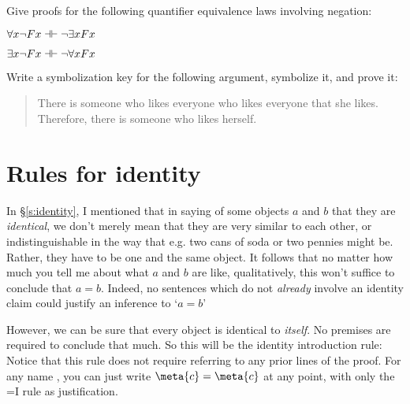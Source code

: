 \problempart Give proofs for the following quantifier equivalence laws involving negation:

\begin{earg}
\item $\forall x \enot Fx \pequiv \enot \exists xFx$
\item $\exists x \enot Fx \pequiv \enot \forall x Fx$
\end{earg}


\problempart
\label{pr.likes}
Write a symbolization key for the following argument, symbolize it, and prove it:
\begin{quote}
There is someone who likes everyone who likes everyone that she likes. Therefore, there is someone who likes herself.
\end{quote}


\section{Rules for identity}\label{s:identityrules}

In \S\ref{s:identity}, I mentioned that in saying of some objects $a$ and $b$ that they are \emph{identical}, we don't merely mean that they are very similar to each other, or indistinguishable in the way that e.g. two cans of soda or two pennies might be. Rather, they have to be one and the same object. It follows that no matter how much you tell me about what  $a$ and $b$ are like, qualitatively, this won't suffice to conclude that $a=b$.  Indeed, no sentences which do not \emph{already} involve an identity claim could justify an inference to `$a=b$'


However, we can be sure that every object is identical to \emph{itself}. No premises are required to conclude that much. So this will be the identity introduction rule:
Notice that this rule does not require referring to any prior lines of the proof. For any name , you can just write $\meta{c}=\meta{c}$ at any point, with only the {=}I rule as justification.


